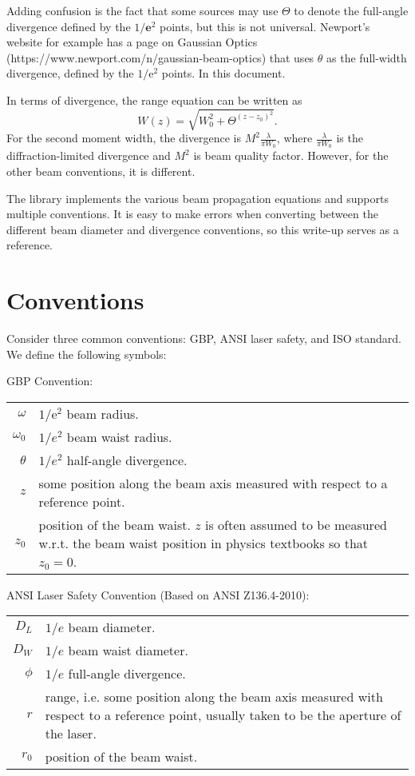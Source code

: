 \documentclass[]{article}
\begin{document}
Adding confusion is the fact that some sources may use $\Theta$ to
denote the full-angle divergence defined by the $1/\textbf{e}^2$ points, but this is not
universal. Newport's website for example has a page on Gaussian Optics (https://www.newport.com/n/gaussian-beam-optics) that uses $\theta$ as the full-width
divergence, defined by the $1/\text{e}^2$ points. In this document.

In terms of divergence, the range equation can be written as
\begin{equation}
    W(z) = \sqrt{W_0^2 + \Theta^(z - z_0)^2}.
\end{equation}
For the second moment width, the divergence is $M^2 \frac{\lambda}{\pi W_0}$, where $\frac{\lambda}{\pi W_0}$ is the diffraction-limited divergence and $M^2$ is beam quality factor.
However, for the other beam conventions, it is different.


The library implements the various beam propagation equations and supports multiple conventions.
It is easy to make errors when converting between the different beam diameter and divergence conventions, so this write-up serves as a reference.

\section{Conventions}

Consider three common conventions: GBP, ANSI laser safety, and ISO standard. We define the following symbols:


GBP Convention:

\begin{tabular}{rp{5in}}
    $\omega$ & $1/\text{e}^2$ beam radius. \\
    $\omega_0$& $1/e^2$ beam waist radius. \\
    $\theta$ & $1/e^2$ half-angle divergence. \\
    $z$ & some position along the beam axis measured with respect to a reference point. \\
    $z_0$ & position of the beam waist. $z$ is often assumed to be measured w.r.t. the beam waist position in physics textbooks so that $z_0 = 0$.
\end{tabular}

ANSI Laser Safety Convention (Based on ANSI Z136.4-2010):

\begin{tabular}{rp{5in}}
$D_L$ & $1/e$ beam diameter. \\
$D_W$ & $1/e$ beam waist diameter. \\
$\phi$ & $1/e$ full-angle divergence. \\
$r$ & range, i.e. some position along the beam axis measured with respect to a reference point, usually taken to be the aperture of the laser. \\
$r_0$ & position of the beam waist.
\end{tabular}
\end{document}
